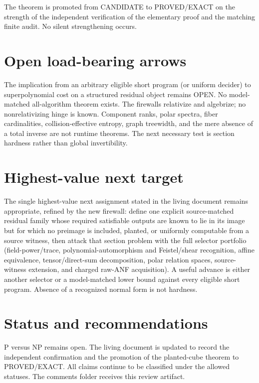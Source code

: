 \documentclass[11pt]{article}
\begin{document}
The theorem is promoted from CANDIDATE to PROVED/EXACT on the strength of the independent verification of the elementary proof and the matching finite audit. No silent strengthening occurs.

\section{Open load-bearing arrows}
The implication from an arbitrary eligible short program (or uniform decider) to superpolynomial cost on a structured residual object remains OPEN. No model-matched all-algorithm theorem exists. The firewalls relativize and algebrize; no nonrelativizing hinge is known. Component ranks, polar spectra, fiber cardinalities, collision-effective entropy, graph treewidth, and the mere absence of a total inverse are not runtime theorems. The next necessary test is section hardness rather than global invertibility.

\section{Highest-value next target}
The single highest-value next assignment stated in the living document remains appropriate, refined by the new firewall: define one explicit source-matched residual family whose required satisfiable outputs are known to lie in its image but for which no preimage is included, planted, or uniformly computable from a source witness, then attack that section problem with the full selector portfolio (field-power/trace, polynomial-automorphism and Feistel/shear recognition, affine equivalence, tensor/direct-sum decomposition, polar relation spaces, source-witness extension, and charged raw-ANF acquisition). A useful advance is either another selector or a model-matched lower bound against every eligible short program. Absence of a recognized normal form is not hardness.

\section{Status and recommendations}
P versus NP remains open. The living document is updated to record the independent confirmation and the promotion of the planted-cube theorem to PROVED/EXACT. All claims continue to be classified under the allowed statuses. The comments folder receives this review artifact.

\end{document}

